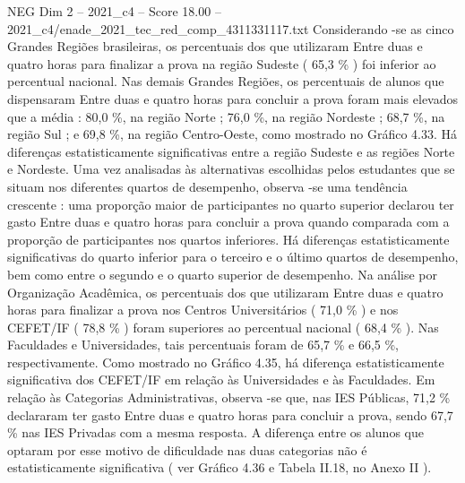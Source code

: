 \begin{textsample}{NEG Dim 2 – 2021\_c4 – Score 18.00 – 2021\_c4/enade\_2021\_tec\_red\_comp\_4311331117.txt}
Considerando -se as cinco Grandes Regiões brasileiras, os percentuais dos que utilizaram Entre duas e quatro horas para finalizar a prova na região Sudeste ( 65,3 \% ) foi inferior ao percentual nacional.
Nas demais Grandes Regiões, os percentuais de alunos que dispensaram Entre duas e quatro horas para concluir a prova foram mais elevados que a média : 80,0 \%, na região Norte ; 76,0 \%, na região Nordeste ; 68,7 \%, na região Sul ; e 69,8 \%, na região Centro-Oeste, como mostrado no Gráfico 4.33.
Há diferenças estatisticamente significativas entre a região Sudeste e as regiões Norte e Nordeste.
Uma vez analisadas às alternativas escolhidas pelos estudantes que se situam nos diferentes quartos de desempenho, observa -se uma tendência crescente : uma proporção maior de participantes no quarto superior declarou ter gasto Entre duas e quatro horas para concluir a prova quando comparada com a proporção de participantes nos quartos inferiores.
Há diferenças estatisticamente significativas do quarto inferior para o terceiro e o último quartos de desempenho, bem como entre o segundo e o quarto superior de desempenho.
Na análise por Organização Acadêmica, os percentuais dos que utilizaram Entre duas e quatro horas para finalizar a prova nos Centros Universitários ( 71,0 \% ) e nos CEFET/IF ( 78,8 \% ) foram superiores ao percentual nacional ( 68,4 \% ).
Nas Faculdades e Universidades, tais percentuais foram de 65,7 \% e 66,5 \%, respectivamente.
Como mostrado no Gráfico 4.35, há diferença estatisticamente significativa dos CEFET/IF em relação às Universidades e às Faculdades.
Em relação às Categorias Administrativas, observa -se que, nas IES Públicas, 71,2 \% declararam ter gasto Entre duas e quatro horas para concluir a prova, sendo 67,7 \% nas IES Privadas com a mesma resposta.
A diferença entre os alunos que optaram por esse motivo de dificuldade nas duas categorias não é estatisticamente significativa ( ver Gráfico 4.36 e Tabela II.18, no Anexo II ).

\end{textsample}
